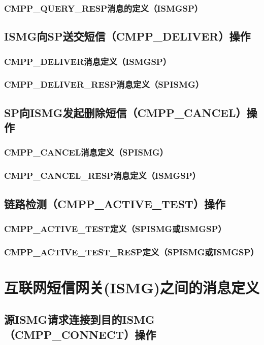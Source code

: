 \documentclass[11pt]{book} %
\begin{document}
\subsubsection{CMPP\_QUERY\_RESP消息的定义（ISMG\textrightarrow SP）}
\subsection{ISMG向SP送交短信（CMPP\_DELIVER）操作}
\subsubsection{CMPP\_DELIVER消息定义（ISMG\textrightarrow SP）}
\subsubsection{CMPP\_DELIVER\_RESP消息定义（SP\textrightarrow ISMG）}
\subsection{SP向ISMG发起删除短信（CMPP\_CANCEL）操作}
\subsubsection{CMPP\_CANCEL消息定义（SP\textrightarrow ISMG）}
\subsubsection{CMPP\_CANCEL\_RESP消息定义（ISMG\textrightarrow SP）}
\subsection{链路检测（CMPP\_ACTIVE\_TEST）操作}
\subsubsection{CMPP\_ACTIVE\_TEST定义（SP\textrightarrow ISMG或ISMG\textrightarrow SP）}
\subsubsection{CMPP\_ACTIVE\_TEST\_RESP定义（SP\textrightarrow ISMG或ISMG\textrightarrow SP）}
\section{互联网短信网关(ISMG)之间的消息定义}
\subsection{源ISMG请求连接到目的ISMG（CMPP\_CONNECT）操作}
\end{document}
